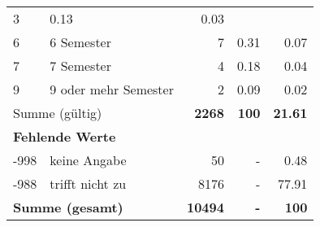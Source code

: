 \begin{longtable}{lXrrr}
       \num{3} &
       \num[round-mode=places,round-precision=2]{0,13} &
         \num[round-mode=places,round-precision=2]{0,03} \\

     6 &
     \multicolumn{1}{X}{ 6 Semester   } &


       \num{7} &
       \num[round-mode=places,round-precision=2]{0,31} &
         \num[round-mode=places,round-precision=2]{0,07} \\

     7 &
     \multicolumn{1}{X}{ 7 Semester   } &


       \num{4} &
       \num[round-mode=places,round-precision=2]{0,18} &
         \num[round-mode=places,round-precision=2]{0,04} \\

     9 &
     \multicolumn{1}{X}{ 9 oder mehr Semester   } &


       \num{2} &
       \num[round-mode=places,round-precision=2]{0,09} &
         \num[round-mode=places,round-precision=2]{0,02} \\
     \midrule
     \multicolumn{2}{l}{Summe (gültig)} &
       \textbf{\num{2268}} &
     \textbf{100} &
       \textbf{\num[round-mode=places,round-precision=2]{21,61}} \\
     \multicolumn{5}{l}{\textbf{Fehlende Werte}}\\
       -998 &
       keine Angabe &
         \num{50} &
        - &
         \num[round-mode=places,round-precision=2]{0,48} \\
       -988 &
       trifft nicht zu &
         \num{8176} &
        - &
         \num[round-mode=places,round-precision=2]{77,91} \\
     \midrule
     \multicolumn{2}{l}{\textbf{Summe (gesamt)}} &
          \textbf{\num{10494}} &
        \textbf{-} &
        \textbf{100} \\
     \bottomrule
     \end{longtable}
     
